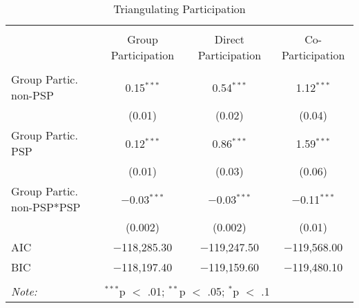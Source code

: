 
\begin{table}[!htbp] \centering 
  \caption{Triangulating Participation} 
  \label{table:partmods} 
\begin{tabular}{@{\extracolsep{5pt}}lccc} 
\\[-1.8ex]\hline \\[-1.8ex] 
 & Group Participation & Direct Participation & Co-Participation \\ 
\hline \\[-1.8ex] 
 Group Partic. non-PSP & 0.15$^{***}$ & 0.54$^{***}$ & 1.12$^{***}$ \\ 
  & (0.01) & (0.02)  & (0.04) \\ 
  Group Partic. PSP & 0.12$^{***}$ & 0.86$^{***}$ & 1.59$^{***}$  \\ 
  & (0.01) & (0.03) &  (0.06)\\ 
  Group Partic. non-PSP*PSP & $-$0.03$^{***}$ &$-$0.03$^{***}$  & $-$0.11$^{***}$ \\ 
  & (0.002) & (0.002)  &(0.01)  \\ 
 AIC & $-$118,285.30 & $-$119,247.50 & $-$119,568.00 \\ 
BIC & $-$118,197.40 & $-$119,159.60 & $-$119,480.10 \\ 
\hline \\[-1.8ex] 
\textit{Note:} & \multicolumn{3}{l}{$^{***}$p $<$ .01; $^{**}$p $<$ .05; $^{*}$p $<$ .1} \\ 
\end{tabular} 
\end{table} 
